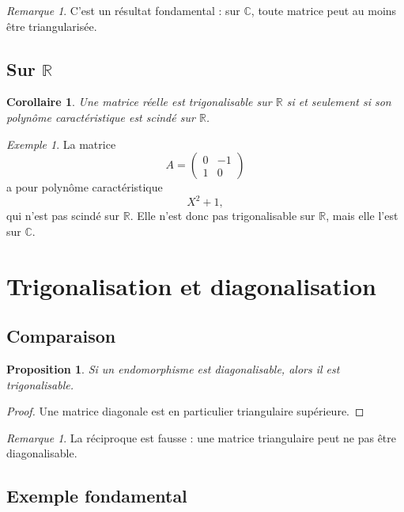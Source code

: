 \documentclass[11pt,a4paper]{article}
\newtheorem{proposition}[definition]{Proposition}
\newtheorem{corollaire}[definition]{Corollaire}
\theoremstyle{remark}
\newtheorem{remarque}[definition]{Remarque}
\newtheorem{exemple}[definition]{Exemple}
\newcommand{\R}{\mathbb{R}}
\newcommand{\C}{\mathbb{C}}
\begin{document}
\begin{remarque}
C’est un résultat fondamental : sur \(\C\), toute matrice peut au moins être triangularisée.
\end{remarque}

\subsection{Sur \(\R\)}

\begin{corollaire}
Une matrice réelle est trigonalisable sur \(\R\) si et seulement si son polynôme caractéristique est scindé sur \(\R\).
\end{corollaire}

\begin{exemple}
La matrice
\[
A=
\begin{pmatrix}
0 & -1\\
1 & 0
\end{pmatrix}
\]
a pour polynôme caractéristique
\[
X^2+1,
\]
qui n’est pas scindé sur \(\R\). Elle n’est donc pas trigonalisable sur \(\R\), mais elle l’est sur \(\C\).
\end{exemple}

\section{Trigonalisation et diagonalisation}

\subsection{Comparaison}

\begin{proposition}
Si un endomorphisme est diagonalisable, alors il est trigonalisable.
\end{proposition}

\begin{proof}
Une matrice diagonale est en particulier triangulaire supérieure.
\end{proof}

\begin{remarque}
La réciproque est fausse : une matrice triangulaire peut ne pas être diagonalisable.
\end{remarque}

\subsection{Exemple fondamental}
\end{document}
